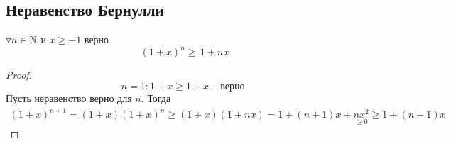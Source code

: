 \subsection{Неравенство Бернулли}
\begin{lemma}
    $ \forall n \in \mathbb{N} $ и $ x \geq  -1 $ верно \begin{equation}
        (1 + x)^ n \geq\, 1 + nx
    \end{equation}
\end{lemma} \begin{proof}
    \begin{equation}
    n = 1: 1 + x \geq 1 + x \text{ -- верно }
   \end{equation}
   Пусть неравенство верно для $ n $. Тогда \begin{multline}
    (1 + x)^{n + 1} = (1 + x)(1 + x)^ n \geq (1 + x)(1 + nx) = 1 + (n + 1)x + \underset{ \geq 0}{nx^2} \geq 1 + (n + 1)x
   \end{multline}
\end{proof}


